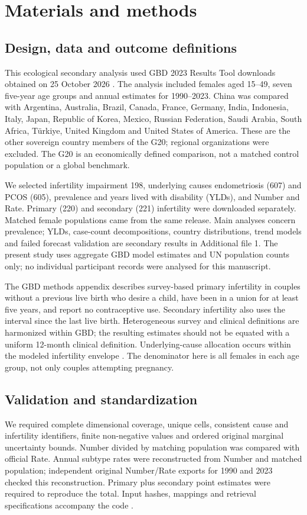 \documentclass[11pt,a4paper]{article}
\begin{document}
\section{Materials and methods}
\subsection{Design, data and outcome definitions}
This ecological secondary analysis used GBD 2023 Results Tool downloads obtained on 25 October 2026 \cite{results}. The analysis included females aged 15--49, seven five-year age groups and annual estimates for 1990--2023. China was compared with Argentina, Australia, Brazil, Canada, France, Germany, India, Indonesia, Italy, Japan, Republic of Korea, Mexico, Russian Federation, Saudi Arabia, South Africa, T\"urkiye, United Kingdom and United States of America. These are the other sovereign country members of the G20; regional organizations were excluded. The G20 is an economically defined comparison, not a matched control population or a global benchmark.

We selected infertility impairment 198, underlying causes endometriosis (607) and PCOS (605), prevalence and years lived with disability (YLDs), and Number and Rate. Primary (220) and secondary (221) infertility were downloaded separately. Matched female populations came from the same release. Main analyses concern prevalence; YLDs, case-count decompositions, country distributions, trend models and failed forecast validation are secondary results in Additional file 1. The present study uses aggregate GBD model estimates and UN population counts only; no individual participant records were analysed for this manuscript.

The GBD methods appendix describes survey-based primary infertility in couples without a previous live birth who desire a child, have been in a union for at least five years, and report no contraceptive use. Secondary infertility also uses the interval since the last live birth. Heterogeneous survey and clinical definitions are harmonized within GBD; the resulting estimates should not be equated with a uniform 12-month clinical definition. Underlying-cause allocation occurs within the modeled infertility envelope \cite{gbd}. The denominator here is all females in each age group, not only couples attempting pregnancy.

\subsection{Validation and standardization}
We required complete dimensional coverage, unique cells, consistent cause and infertility identifiers, finite non-negative values and ordered original marginal uncertainty bounds. Number divided by matching population was compared with official Rate. Annual subtype rates were reconstructed from Number and matched population; independent original Number/Rate exports for 1990 and 2023 checked this reconstruction. Primary plus secondary point estimates were required to reproduce the total. Input hashes, mappings and retrieval specifications accompany the code \cite{repository}.
\end{document}
